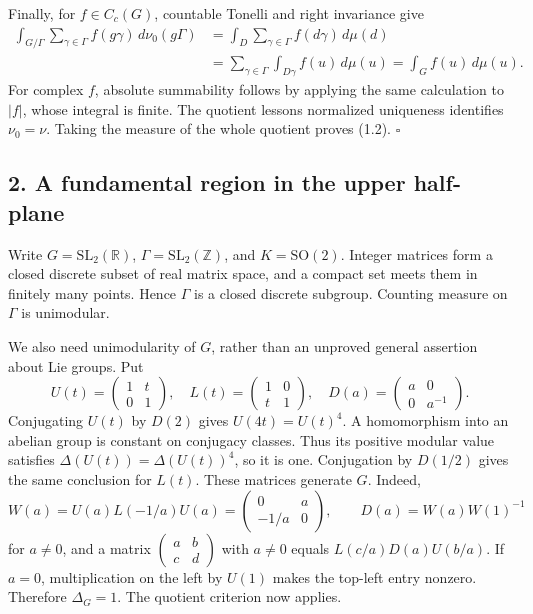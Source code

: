 \documentclass[
  english,
  11pt,
  a4paper,
]{article}
\begin{document}
Finally, for \(f\in C_c(G)\), countable Tonelli and right invariance
give \[\begin{aligned}
\int_{G/\Gamma}\sum_{\gamma\in\Gamma}f(g\gamma)\,d\nu_0(g\Gamma)
&=\int_D\sum_{\gamma\in\Gamma}f(d\gamma)\,d\mu(d)\\
&=\sum_{\gamma\in\Gamma}\int_{D\gamma}f(u)\,d\mu(u)
=\int_Gf(u)\,d\mu(u).
\end{aligned}\] For complex \(f\), absolute summability follows by
applying the same calculation to \(|f|\), whose integral is finite. The
quotient lesson\textquotesingle s normalized uniqueness identifies
\(\nu_0=\nu\). Taking the measure of the whole quotient proves (1.2).
\(\square\)

\subsection{2. A fundamental region in the upper
half-plane}\label{finite-covolume-and-arithmetic-quotients--2-a-fundamental-region-in-the-upper-half-plane}

Write \(G=\mathrm{SL}_2(\mathbb R)\),
\(\Gamma=\mathrm{SL}_2(\mathbb Z)\), and \(K=\mathrm{SO}(2)\). Integer
matrices form a closed discrete subset of real matrix space, and a
compact set meets them in finitely many points. Hence \(\Gamma\) is a
closed discrete subgroup. Counting measure on \(\Gamma\) is unimodular.

We also need unimodularity of \(G\), rather than an unproved general
assertion about Lie groups. Put
\[U(t)=\begin{pmatrix}1&t\\0&1\end{pmatrix},\quad
L(t)=\begin{pmatrix}1&0\\t&1\end{pmatrix},\quad
D(a)=\begin{pmatrix}a&0\\0&a^{-1}\end{pmatrix}.\] Conjugating \(U(t)\)
by \(D(2)\) gives \(U(4t)=U(t)^4\). A homomorphism into an abelian group
is constant on conjugacy classes. Thus its positive modular value
satisfies \(\Delta(U(t))=\Delta(U(t))^4\), so it is one. Conjugation by
\(D(1/2)\) gives the same conclusion for \(L(t)\). These matrices
generate \(G\). Indeed,
\[W(a)=U(a)L(-1/a)U(a)=\begin{pmatrix}0&a\\-1/a&0\end{pmatrix},
\qquad D(a)=W(a)W(1)^{-1}\] for \(a\ne0\), and a matrix
\(\begin{pmatrix}a&b\\c&d\end{pmatrix}\) with \(a\ne0\) equals
\(L(c/a)D(a)U(b/a)\). If \(a=0\), multiplication on the left by \(U(1)\)
makes the top-left entry nonzero. Therefore \(\Delta_G=1\). The quotient
criterion now applies.
\end{document}
